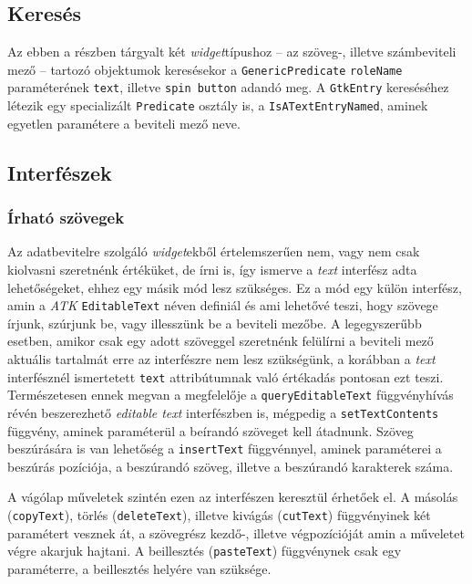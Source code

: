 \subsection{Keresés}

Az ebben a részben tárgyalt két \textit{widget}típushoz -- az szöveg-, illetve számbeviteli mező -- tartozó objektumok keresésekor a \texttt{GenericPredicate} \texttt{roleName} paraméterének \texttt{text}, illetve \texttt{spin button} adandó meg. A \texttt{GtkEntry} kereséséhez létezik egy specializált \texttt{Predicate} osztály is, a \texttt{IsATextEntryNamed}, aminek egyetlen paramétere a beviteli mező neve.

\subsection{Interfészek}

\subsubsection{Írható szövegek}

Az adatbevitelre szolgáló \textit{widget}ekből értelemszerűen nem, vagy nem csak kiolvasni szeretnénk értéküket, de írni is, így ismerve a \textit{text} interfész adta lehetőségeket, ehhez egy másik mód lesz szükséges. Ez a mód egy külön interfész, amin a \textit{ATK} \texttt{EditableText} néven definiál és ami lehetővé teszi, hogy szövege írjunk, szúrjunk be, vagy illesszünk be a beviteli mezőbe. A legegyszerűbb esetben, amikor csak egy adott szöveggel szeretnénk felülírni a beviteli mező aktuális tartalmát erre az interfészre nem lesz szükségünk, a korábban a \textit{text} interfésznél ismertetett \texttt{text} attribútumnak való értékadás pontosan ezt teszi. Természetesen ennek megvan a megfelelője a \texttt{queryEditableText} függvényhívás révén beszerezhető \textit{editable text} interfészben is, mégpedig a \texttt{setTextContents} függvény, aminek paraméterül a beírandó szöveget kell átadnunk. Szöveg beszúrására is van lehetőség a \texttt{insertText} függvénnyel, aminek paraméterei a beszúrás pozíciója, a beszúrandó szöveg, illetve a beszúrandó karakterek száma.

A vágólap műveletek szintén ezen az interfészen keresztül érhetőek el. A másolás (\texttt{copyText}), törlés (\texttt{deleteText}), illetve kivágás (\texttt{cutText}) függvényinek két paramétert vesznek át, a szövegrész kezdő-, illetve végpozícióját amin a műveletet végre akarjuk hajtani. A beillesztés (\texttt{pasteText}) függvénynek csak egy paraméterre, a beillesztés helyére van szüksége.

